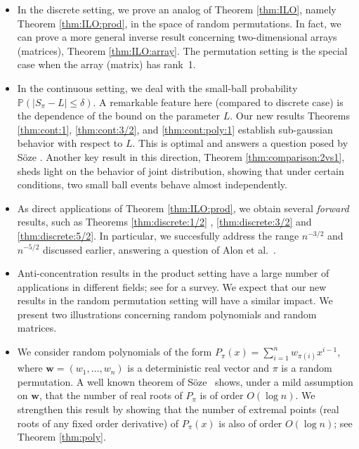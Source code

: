 \documentclass[reqno]{amsart}
\renewcommand\P{{\mathbb{P}}}
\newcommand\BMw{{\bm w}}
\theoremstyle{plain}
\theoremstyle{definition}
\begin{document}
\begin{itemize}  
\item In the discrete setting, we prove an analog of Theorem \ref{thm:ILO}, namely Theorem \ref{thm:ILO:prod}, in the space of random permutations. In fact, we can prove a more general inverse result concerning two-dimensional arrays (matrices), Theorem \ref{thm:ILO:array}. The permutation setting is the special case when the array (matrix) has rank~1.

\vskip2mm 

\item In the continuous setting, 
we deal with the 
small-ball probability $\P (|S_{\pi} -L| \le \delta) $.  A remarkable feature here (compared to discrete case) is the dependence of the bound on the parameter $L$. 
Our new results Theorems \ref{thm:cont:1}, \ref{thm:cont:3/2}, and \ref{thm:cont:poly:1} establish  sub-gaussian behavior with respect to $L$. This is optimal and  answers a question posed by  S{\"o}ze \cite{Soze2}. Another key result in this direction, Theorem \ref{thm:comparison:2vs1}, sheds light on the behavior of joint distribution, showing that under certain conditions, two small ball events behave almost independently. 

\vskip2mm 

\item As direct  applications of Theorem \ref{thm:ILO:prod}, we obtain 
 several  {\it forward} results,  such as Theorems \ref{thm:discrete:1/2} , \ref{thm:discrete:3/2} and \ref{thm:discrete:5/2}.  In particular, we 
 succesfully address the range $n^{-3/2}$ and $n^{-5/2}$ discussed earlier, answering a question of Alon et al.~\cite{APZ}.

 \vskip2mm 

\item Anti-concentration results in the product setting have a large number of applications in different fields; see \cite{NVsur} for a survey. We expect that our new results in the random permutation setting will have a similar impact. We present two illustrations concerning random polynomials and random matrices.

\vskip2mm 


\item We consider random polynomials of the form 
$P_{\pi}(x)= \sum_{i=1}^n w_{\pi(i) } x^{i-1}$, where $\BMw=(w_1,\dots,w_n)$ is a deterministic real vector and $\pi$ is a random permutation. A well known theorem of S{\"o}ze~\cite{Soze2} shows, under a mild assumption on $\BMw$,  that the number of real roots of $P_{\pi}$ is of order 
$O(\log n)$. We strengthen this result by showing that the number of 
extremal points (real roots of any fixed order derivative) of $P_{\pi}(x)$
is also of order $O(\log n)$; see Theorem \ref{thm:poly}. 



\end{itemize}
\end{document}
